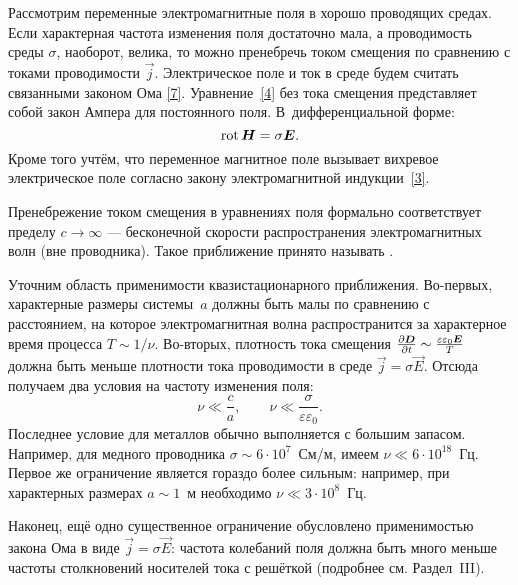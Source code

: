 
Рассмотрим переменные электромагнитные поля в хорошо проводящих средах.
Если характерная частота изменения поля достаточно мала, а проводимость
среды $\sigma$, наоборот, велика, то можно пренебречь током смещения
по сравнению с токами проводимости $\vec{j}$.
Электрическое поле и ток в среде будем считать связанными законом Ома \eqref{7}.
Уравнение~\eqref{4} без тока смещения представляет собой закон Ампера 
для постоянного поля. В~дифференциальной форме:
\begin{equation}\eqmark{ampere-dif}
\Rot \vec{H} = \sigma \vec{E}.
\end{equation}
Кроме того учтём, что переменное магнитное поле вызывает
вихревое электрическое поле согласно закону электромагнитной индукции~\eqref{3}.

Пренебрежение током смещения в уравнениях поля формально соответствует
пределу $c\to \infty$ --- бесконечной скорости распространения 
электромагнитных волн (вне проводника). Такое приближение принято называть .

\begin{lab:note}
    Уточним область применимости квазистационарного приближения.
    Во-первых, характерные размеры системы~$a$ должны быть малы по
    сравнению с расстоянием, на которое электромагнитная волна распространится
    за характерное время процесса $T\sim 1/\nu$.
    Во-вторых, плотность тока смещения 
    $\frac{\partial {\boldsymbol{D}}}{\partial t} \sim \frac{\varepsilon\varepsilon_0 {\boldsymbol{E}}}{T}$ 
    должна быть меньше плотности тока проводимости в среде $\vec{j}=\sigma\vec{E}$.
    Отсюда получаем два условия на частоту изменения поля:
    \[
    \nu \ll \frac{c}{a},\qquad \nu \ll \frac{\sigma}{\varepsilon\varepsilon_0}.
    \]
    Последнее условие для металлов обычно выполняется с большим запасом. 
    Например, для медного проводника $\sigma \sim 6\cdot 10^7$~См/м,
    имеем $\nu \ll 6\cdot 10^{18}$~Гц. Первое же ограничение является гораздо 
    более сильным: например, при характерных размерах $a\sim 1$~м необходимо
    $\nu \ll 3 \cdot 10^8$~Гц.
    
    Наконец, ещё одно существенное ограничение обусловлено применимостью закона Ома в виде
    $\vec{j}=\sigma \vec{E}$: частота колебаний поля должна быть много меньше 
    частоты столкновений носителей тока с решёткой
    (подробнее см. Раздел~III).
\end{lab:note}



